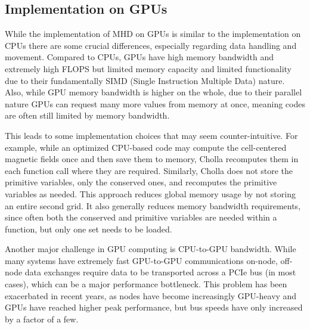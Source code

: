 \subsection{Implementation on GPUs}
\label{sec:gpu-vs-cpu}

While the implementation of MHD on GPUs is similar to the implementation on CPUs there are some crucial differences, especially regarding data handling and movement. Compared to CPUs, GPUs have high memory bandwidth and extremely high FLOPS but limited memory capacity and limited functionality due to their fundamentally SIMD (Single Instruction Multiple Data) nature. Also, while GPU memory bandwidth is higher on the whole, due to their parallel nature GPUs can request many more values from memory at once, meaning codes are often still limited by memory bandwidth.

This leads to some implementation choices that may seem counter-intuitive. For example, while an optimized CPU-based code may compute the cell-centered magnetic fields once and then save them to memory, Cholla recomputes them in each function call where they are required. Similarly, Cholla does not store the primitive variables, only the conserved ones, and recomputes the primitive variables as needed. This approach reduces global memory usage by not storing an entire second grid. It also generally reduces memory bandwidth requirements, since often both the conserved and primitive variables are needed within a function, but only one set needs to be loaded.

Another major challenge in GPU computing is CPU-to-GPU bandwidth. While many systems have extremely fast GPU-to-GPU communications on-node, off-node data exchanges require data to be transported across a PCIe bus (in most cases), which can be a major performance bottleneck. This problem has been exacerbated in recent years, as nodes have become increasingly GPU-heavy and GPUs have reached higher peak performance, but bus speeds have only increased by a factor of a few.


